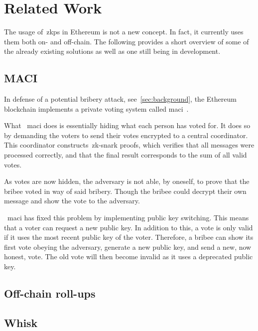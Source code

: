 
\section{Related Work}\label{sec:related-work}
The usage of~\glspl{zkp} in Ethereum is not a new concept.
In fact, it currently uses them both on- and off-chain.
The following provides a short overview of some of the already existing solutions as well as one still being in development.
\subsection{MACI}\label{subsec:MACI}
In defense of a potential bribery attack, see~\autoref{sec:background}, the Ethereum blockchain implements a private voting system called \gls{maci}~\cite{EthereumAttacks2024,MACI2022}.

What ~\gls{maci} does is essentially hiding what each person has voted for.
It does so by demanding the voters to send their votes encrypted to a central coordinator.
This coordinator constructs~\gls{zk-snark} proofs, which verifies that all messages were processed correctly, and that the final result corresponds to the sum of all valid votes.

As votes are now hidden, the adversary is not able, by oneself, to prove that the bribee voted in way of said bribery.
Though the bribee could decrypt their own message and show the vote to the adversary.

~\gls{maci} has fixed this problem by implementing public key switching.
This means that a voter can request a new public key.
In addition to this, a vote is only valid if it uses the most recent public key of the voter.
Therefore, a bribee can show its first vote obeying the adversary, generate a new public key, and send a new, now honest, vote.
The old vote will then become invalid as it uses a deprecated public key.

\subsection{Off-chain roll-ups}\label{subsec:off-chain-roll-ups}
\subsection{Whisk}\label{subsec:whisk}

